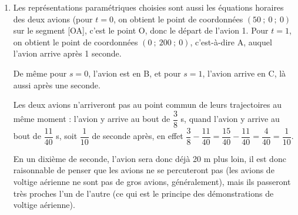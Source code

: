 \begin{enumerate}
$\aligned \begin{cases}	0 = -33 + 120s\\200t = 75\\0 = 44 - 160s\end{cases}
&\iff \begin{cases}	120s = 33\\t = \dfrac{75}{200}\\160s = 44\end{cases}\\
&\iff \begin{cases}	s = \dfrac{33}{120}\\t = \dfrac{3}{8}\\s = \dfrac{44}{160}\end{cases} \\
&\iff \begin{cases}	s = \dfrac{11}{40}\\t = \dfrac{3}{8}\\s = \dfrac{11}{40}\end{cases} \\ \endaligned$

Le système a effectivement une unique solution, les deux trajectoires ont donc bien un point commun, qui est le point de paramètre $t = \dfrac{3}{8}$ sur [0A], qui est aussi le point de paramètre $s = \dfrac{11}{40}$ sur [BC], c'est le point de coordonnées $(0~;~75~;~0)$.


\item Les représentations paramétriques choisies sont aussi les équations horaires des deux avions (pour $t = 0$, on obtient le point de coordonnées $(50~;~0~;~0)$ sur le segment [OA], c'est le point O, donc le départ de l'avion 1. Pour $t = 1$, on obtient le point de coordonnées $(0~;~200~;~0)$, c'est-à-dire A, auquel l'avion arrive après 1 seconde.

De même pour $s = 0$, l'avion  est en B, et pour $s=1$, l'avion arrive en C, là aussi après une seconde.

Les deux avions n'arriveront pas au point commun de leurs trajectoires au même moment : l'avion  y arrive au bout de $\dfrac{3}{8}$ s, quand l'avion  y arrive au bout de $\dfrac{11}{40}$ s, soit $\dfrac{1}{10}$ de seconde après, en effet $\dfrac{3}{8} - \dfrac{11}{40} = \dfrac{15}{40} - \dfrac{11}{40} = \dfrac{4}{40} = \dfrac{1}{10}$.

En un dixième de seconde, l'avion  sera donc déjà 20 m plus loin, il est donc raisonnable de penser que les avions ne se percuteront pas (les avions de voltige aérienne ne sont pas de gros avions, généralement), mais ils passeront très proches l'un de l'autre (ce qui est le principe des démonstrations de voltige aérienne).
\end{enumerate}
